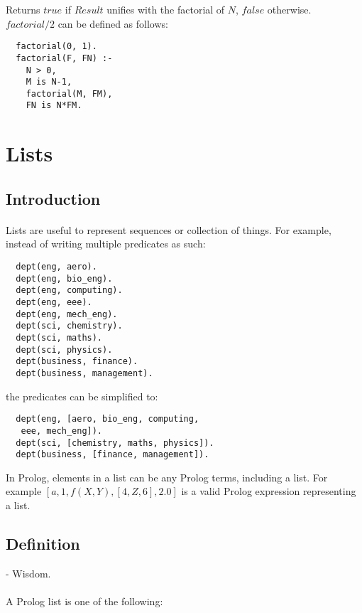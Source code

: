 \documentclass{article}
\begin{document}
\begin{multicols}{2}
  Returns $true$ if $Result$ unifies with the factorial of $N$, $false$ otherwise. $factorial/2$ can be defined as follows:
  
  \begin{lstlisting}
  factorial(0, 1).
  factorial(F, FN) :-
    N > 0,
    M is N-1,
    factorial(M, FM),
    FN is N*FM.
  \end{lstlisting}
  
  \section{Lists}  
  
  \subsection{Introduction}
  
  \paragraph{} Lists are useful to represent sequences or collection of things. For example, instead of writing multiple predicates as such:
  
  \begin{lstlisting}
  dept(eng, aero).
  dept(eng, bio_eng).
  dept(eng, computing).
  dept(eng, eee).
  dept(eng, mech_eng).
  dept(sci, chemistry).
  dept(sci, maths).
  dept(sci, physics).
  dept(business, finance).
  dept(business, management).
  \end{lstlisting}
  
  the predicates can be simplified to:
  
  \begin{lstlisting}
  dept(eng, [aero, bio_eng, computing,
   eee, mech_eng]).
  dept(sci, [chemistry, maths, physics]).
  dept(business, [finance, management]).
  \end{lstlisting}
  
  In Prolog, elements in a list can be any Prolog terms, including a list. For example $[a, 1, f(X, Y), [4, Z, 6], 2.0]$ is a valid Prolog expression representing a list.
  
  \subsection{Definition}
  
   - Wisdom.
  
  \paragraph{} A Prolog list is one of the following:
  

\end{multicols}
\end{document}
